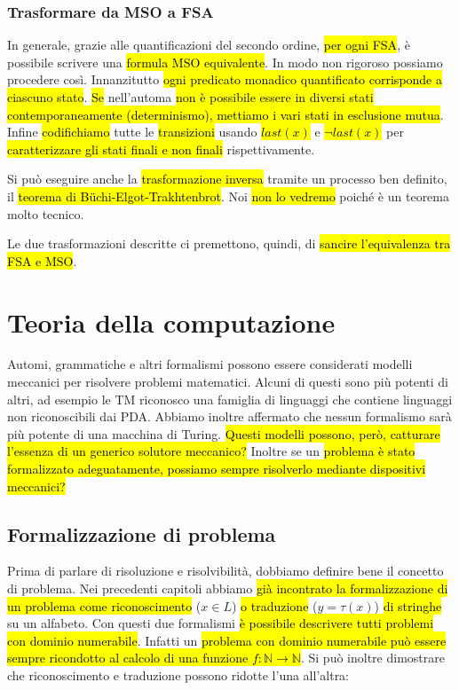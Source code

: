 \documentclass[a4paper,11pt,twoside]{article}
\theoremstyle{plain}
\theoremstyle{definition}
\theoremstyle{remark}
\begin{document}
\subsubsection{Trasformare da MSO a FSA}\label{sec:mso-fsa}

In generale, grazie alle quantificazioni del secondo ordine, \hl{per ogni FSA},
è possibile scrivere una \hl{formula MSO equivalente}. In modo non rigoroso
possiamo procedere così. Innanzitutto \hl{ogni predicato monadico quantificato
corrisponde a ciascuno stato}. \hl{Se} nell'automa \hl{non è possibile essere in
diversi stati contemporaneamente (determinismo), mettiamo i vari stati in
esclusione mutua}. Infine \hl{codifichiamo} tutte le \hl{transizioni} usando
\hl{$last(x)$} e \hl{$\neg last(x)$} per \hl{caratterizzare gli stati finali e
non finali} rispettivamente.

Si può eseguire anche la \hl{trasformazione inversa} tramite un processo ben
definito, il \hl{teorema di Büchi-Elgot-Trakhtenbrot}. Noi \hl{non lo vedremo}
poiché è un teorema molto tecnico.

Le due trasformazioni descritte ci premettono, quindi, di \hl{sancire
l'equivalenza tra FSA e MSO}\@.

\section{Teoria della computazione}\label{sec:teoria-computazione}

Automi, grammatiche e altri formalismi possono essere considerati modelli
meccanici per risolvere problemi matematici. Alcuni di questi sono più potenti
di altri, ad esempio le TM riconosco una famiglia di linguaggi che contiene
linguaggi non riconoscibili dai PDA\@. Abbiamo inoltre affermato che nessun
formalismo sarà più potente di una macchina di Turing. \hl{Questi modelli
possono, però, catturare l'essenza di un generico solutore meccanico?} Inoltre
se un \hl{problema è stato formalizzato adeguatamente, possiamo sempre
risolverlo mediante dispositivi meccanici?}

\subsection{Formalizzazione di problema}

Prima di parlare di risoluzione e risolvibilità, dobbiamo definire bene il
concetto di problema. Nei precedenti capitoli abbiamo \hl{già incontrato la
formalizzazione di un problema come riconoscimento} ($x \in L$) \hl{o
traduzione} ($y = \tau(x)$) \hl{di stringhe} su un alfabeto. Con questi due
formalismi \hl{è possibile descrivere tutti problemi con dominio numerabile}.
Infatti un \hl{problema con dominio numerabile può essere sempre ricondotto al
calcolo di una funzione $f: \mathbb{N} \to \mathbb{N}$}. Si può inoltre
dimostrare che riconoscimento e traduzione possono ridotte l'una all'altra:
\end{document}
